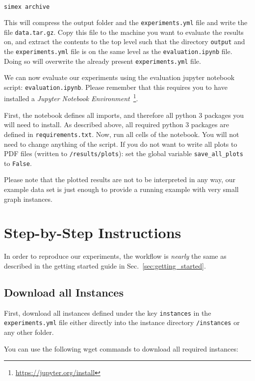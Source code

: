 \documentclass[11pt, a4paper]{scrartcl}
\newcommand{\expfile}{\texttt{experiments.yml} file\xspace}
\begin{document}
\begin{lstlisting}[language=bash]
simex archive
\end{lstlisting}

This will compress the output folder and the \expfile and write the file
\texttt{data.tar.gz}. Copy this file to the machine you want to evaluate the
results on, and extract the contents to the top level such that the directory
\texttt{output} and the \expfile is on the same level as the
\texttt{evaluation.ipynb} file. Doing so will overwrite the already present
\expfile.

We can now evaluate our experiments using the evaluation jupyter notebook
script: \texttt{evaluation.ipynb}. Please remember that this requires you to
have installed a \emph{Jupyter Notebook
Environment}~\footnote{\url{https://jupyter.org/install}}.

First, the notebook defines all imports, and therefore all python 3 packages you
will need to install. As described above, all required python 3 packages are
defined in \texttt{requirements.txt}. Now, run all cells of the notebook. You
will not need to change anything of the script. If you do not want to write all
plots to PDF files (written to \texttt{/results/plots}): set the global variable
\texttt{save\_all\_plots} to \texttt{False}.

Please note that the plotted results are not to be interpreted in any way, our
example data set is just enough to provide a running example with very small
graph instances.

\section{Step-by-Step Instructions}\label{sec:step_by_step}

In order to reproduce our experiments, the workflow is \emph{nearly} the same as
described in the getting started guide in Sec.~\ref{sec:getting_started}.

\subsection{Download all Instances}

First, download all instances defined under the key \texttt{instances} in the
\expfile either directly into the instance directory \texttt{/instances} or any
other folder.

You can use the following wget commands to download all required instances:
\end{document}
